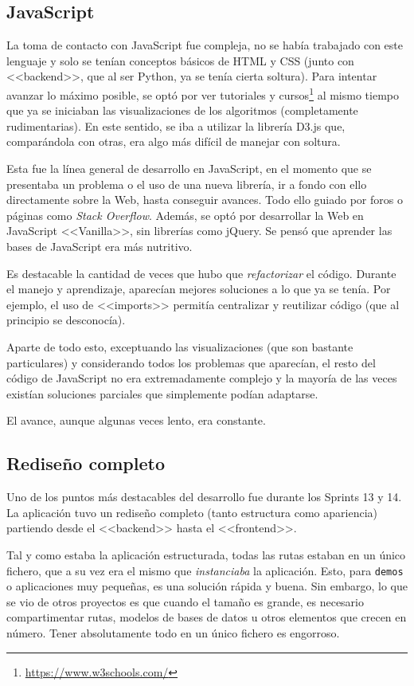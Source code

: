 \subsection{JavaScript}
La toma de contacto con JavaScript fue compleja, no se había trabajado con este
lenguaje y solo se tenían conceptos básicos de HTML y CSS (junto con
<<backend>>, que al ser Python, ya se tenía cierta soltura). Para intentar
avanzar lo máximo posible, se optó por ver tutoriales y
cursos\footnote{\url{https://www.w3schools.com/}} al mismo tiempo que ya se
iniciaban las visualizaciones de los algoritmos (completamente rudimentarias).
En este sentido, se iba a utilizar la librería D3.js que, comparándola con
otras, era algo más difícil de manejar con soltura.

Esta fue la línea general de desarrollo en JavaScript, en el momento que se
presentaba un problema o el uso de una nueva librería, ir a fondo con ello
directamente sobre la Web, hasta conseguir avances. Todo ello guiado por foros o
páginas como \textit{Stack Overflow}. Además, se optó por desarrollar la Web en
JavaScript <<Vanilla>>, sin librerías como jQuery. Se pensó que aprender las
bases de JavaScript era más nutritivo.

Es destacable la cantidad de veces que hubo que \textit{refactorizar} el código.
Durante el manejo y aprendizaje, aparecían mejores soluciones a lo que ya se
tenía. Por ejemplo, el uso de <<imports>> permitía centralizar y reutilizar
código (que al principio se desconocía).

Aparte de todo esto, exceptuando las visualizaciones (que son bastante
particulares) y considerando todos los problemas que aparecían, el resto del
código de JavaScript no era extremadamente complejo y la mayoría de las veces
existían soluciones parciales que simplemente podían adaptarse. 

El avance, aunque algunas veces lento, era constante.

\subsection{Rediseño completo}

Uno de los puntos más destacables del desarrollo fue durante los Sprints 13 y
14. La aplicación tuvo un rediseño completo (tanto estructura como apariencia)
partiendo desde el <<backend>> hasta el <<frontend>>.

Tal y como estaba la aplicación estructurada, todas las rutas estaban en un
único fichero, que a su vez era el mismo que \textit{instanciaba} la aplicación.
Esto, para \texttt{demos} o aplicaciones muy pequeñas, es una solución rápida y
buena. Sin embargo, lo que se vio de otros proyectos es que cuando el tamaño es
grande, es necesario compartimentar rutas, modelos de bases de datos u otros
elementos que crecen en número. Tener absolutamente todo en un único fichero es
engorroso.

